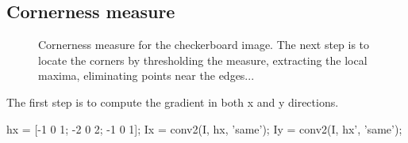 \def\QRCODE{TB_IPR_TUT.IMG.harris_detector_matlabqrcode.png}
\def\QRPAGE{http://www.iptutorials.science/tree/master/TB_IPR/TUT.IMG.harris_detector/matlab}


\subsection{Cornerness measure}

\begin{figure}[htbp]
 \centering
 \hfill
 \hfill
 \caption{Cornerness measure for the checkerboard image. The next step is to locate the corners by thresholding the measure, extracting the local maxima, eliminating points near the edges...}
 \label{fig:harris:matlab:cornerness}
\end{figure}

The first step is to compute the gradient in both x and y directions.
\begin{matlab}
hx = [-1  0 1; -2 0 2; -1 0 1];
Ix = conv2(I, hx,  'same');
Iy = conv2(I, hx', 'same');
\end{matlab}

